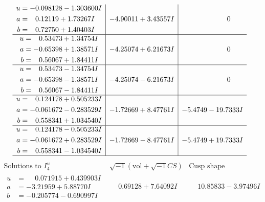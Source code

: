 \documentclass[1p]{elsarticle_modified}
\theoremstyle{definition}
\newcommand{\I}{\sqrt{-1}}
\begin{document}
$$\begin{array}{c|c|c}
\begin{aligned}
u &= -0.098128 - 1.303600 I \\
a &= \phantom{-}0.12119 + 1.73267 I \\
b &= \phantom{-}0.72750 + 1.40403 I\end{aligned}
 & -4.90011 + 3.43557 I & \phantom{-0.000000 } 0 \\ \hline\begin{aligned}
u &= \phantom{-}0.53473 + 1.34754 I \\
a &= -0.65398 + 1.38571 I \\
b &= \phantom{-}0.56067 + 1.84411 I\end{aligned}
 & -4.25074 + 6.21673 I & \phantom{-0.000000 } 0 \\ \hline\begin{aligned}
u &= \phantom{-}0.53473 - 1.34754 I \\
a &= -0.65398 - 1.38571 I \\
b &= \phantom{-}0.56067 - 1.84411 I\end{aligned}
 & -4.25074 - 6.21673 I & \phantom{-0.000000 } 0 \\ \hline\begin{aligned}
u &= \phantom{-}0.124178 + 0.505233 I \\
a &= -0.061672 - 0.283529 I \\
b &= \phantom{-}0.558341 + 1.034540 I\end{aligned}
 & -1.72669 + 8.47761 I & -5.4749 - 19.7333 I \\ \hline\begin{aligned}
u &= \phantom{-}0.124178 - 0.505233 I \\
a &= -0.061672 + 0.283529 I \\
b &= \phantom{-}0.558341 - 1.034540 I\end{aligned}
 & -1.72669 - 8.47761 I & -5.4749 + 19.7333 I\\
 \hline 
 \end{array}$$\newpage$$\begin{array}{c|c|c}  
\text{Solutions to }I^u_{4}& \I (\text{vol} + \sqrt{-1}CS) & \text{Cusp shape}\\
 \hline 
\begin{aligned}
u &= \phantom{-}0.071915 + 0.439903 I \\
a &= -3.21959 + 5.88770 I \\
b &= -0.205774 - 0.690997 I\end{aligned}
 & \phantom{-}0.69128 + 7.64092 I & \phantom{-}10.85833 - 3.97496 I \\ \hline\begin{aligned}

\end{aligned}
\end{array}$$
\end{document}
